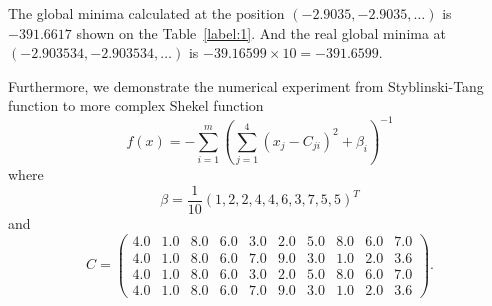 \documentclass[11pt,fceqn]{article}
\numberwithin{equation}{section}
\theoremstyle{definition}
\begin{document}
The global minima calculated at the position $(-2.9035,-2.9035,\ldots)$ is $-391.6617$ shown on the Table~\ref{label:1}. And the real global minima  at $(-2.903534,-2.903534,\ldots)$ is $-39.16599\times 10 = -391.6599$.

Furthermore, we demonstrate the numerical experiment from Styblinski-Tang function to more complex Shekel function 
\begin{equation}
\label{eqn:shekel}
f(x) = - \sum_{i=1}^{m} \left(\sum_{j=1}^{4}\left(x_{j} - C_{ji}\right)^{2} + \beta_{i}\right)^{-1}
\end{equation} 
where $$\beta = \frac{1}{10}\left(1, 2, 2, 4, 4, 6, 3, 7, 5, 5\right)^{T}$$
and
$$
C = \begin{pmatrix}
    4.0 & 1.0 & 8.0 & 6.0 & 3.0 & 2.0 & 5.0 & 8.0 & 6.0 & 7.0 \\
    4.0 & 1.0 & 8.0 & 6.0 & 7.0 & 9.0 & 3.0 & 1.0 & 2.0 & 3.6 \\
    4.0 & 1.0 & 8.0 & 6.0 & 3.0 & 2.0 & 5.0 & 8.0 & 6.0 & 7.0 \\
    4.0 & 1.0 & 8.0 & 6.0 & 7.0 & 9.0 & 3.0 & 1.0 & 2.0 & 3.6 
    \end{pmatrix}.
$$
\end{document}
